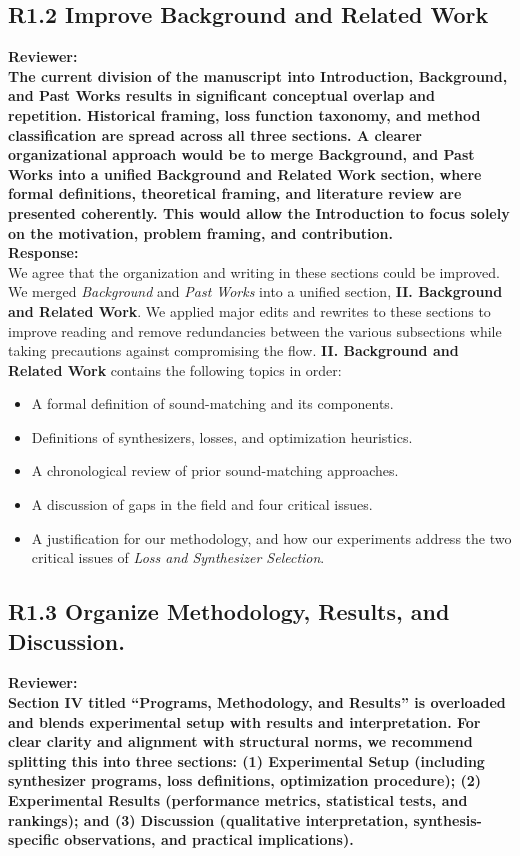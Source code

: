 \documentclass[11pt]{article}
\begin{document}
\subsection{R1.2 Improve Background and Related Work}
\label{R1.2}
\noindent\textbf{Reviewer:}\\
\noindent\textbf{The current division of the manuscript into Introduction, Background, and Past Works results in significant conceptual overlap and repetition. Historical framing, loss function taxonomy, and method classification are spread across all three sections. A clearer organizational approach would be to merge Background, and Past Works into a unified Background and Related Work section, where formal definitions, theoretical framing, and literature review are presented coherently. This would allow the Introduction to focus solely on the motivation, problem framing, and contribution.}\\

\noindent\textbf{Response:} \\
We agree that the organization and writing in these sections could be improved. We merged \emph{Background} and \emph{Past Works} into a unified section, \textbf{II. Background and Related Work}. We applied major edits and rewrites to these sections to improve reading and remove redundancies between the various subsections while taking precautions against compromising the flow.
\textbf{II. Background and Related Work} contains the following topics in order:  
\begin{itemize}
  \item A formal definition of sound-matching and its components.
  \item Definitions of synthesizers, losses, and optimization heuristics. 
  \item A chronological review of prior sound-matching approaches.
  \item A discussion of gaps in the field and four critical issues.
  \item A justification for our methodology, and how our experiments address the two critical issues of \emph{Loss and Synthesizer Selection}.
\end{itemize}


\subsection*{R1.3 Organize Methodology, Results, and Discussion.}
\label{R1.3}
\noindent\textbf{Reviewer:}\\
\textbf{Section IV titled ``Programs, Methodology, and Results'' is overloaded and blends experimental setup with results and interpretation. For clear clarity and alignment with structural norms, we recommend splitting this into three sections: (1) Experimental Setup (including synthesizer programs, loss definitions, optimization procedure); (2) Experimental Results (performance metrics, statistical tests, and rankings); and (3) Discussion (qualitative interpretation, synthesis-specific observations, and practical implications).}
\\
\end{document}
